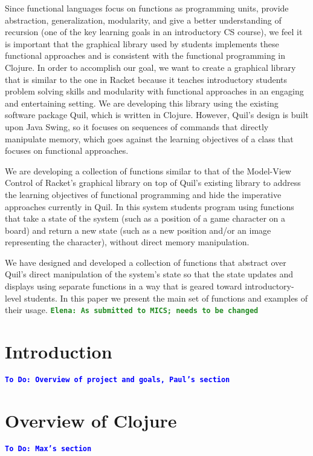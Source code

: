 \documentclass[12pt]{article}
\newcommand{\comment}[1]{{\bf \tt  {#1}}}
\newcommand{\emcomment}[1]{\textcolor{ForestGreen}{\comment{Elena: {#1}}}}
\newcommand{\todo}[1]{\textcolor{blue}{\comment{To Do: {#1}}}}
\begin{document}
Since functional languages focus on functions as programming units, provide abstraction, generalization, modularity, and give a better understanding of recursion (one of the key learning goals in an introductory CS course), we feel it is important that the graphical library used by students implements these functional approaches and is consistent with the functional programming in Clojure. In order to accomplish our goal, we want to create a graphical library that is similar to the one in Racket because it teaches introductory students problem solving skills and modularity with functional approaches in an engaging and entertaining setting. We are developing this library using the existing software package Quil, which is written in Clojure. However, Quil’s design is built upon Java Swing, so it focuses on sequences of commands that directly manipulate memory, which goes against the learning objectives of a class that focuses on functional approaches.

We are developing a collection of functions similar to that of the Model-View Control of Racket’s graphical library on top of Quil’s existing library to address the learning objectives of functional programming and hide the imperative approaches currently in Quil. In this system students program using functions that take a state of the system (such as a position of a game character on a board) and return a new state (such as a new position and/or an image representing the character), without direct memory manipulation.

We have designed and developed a collection of functions that abstract over Quil’s direct manipulation of the system’s state so that the state updates and displays using separate functions in a way that is geared toward introductory-level students. In this paper we present the main set of functions and examples of their usage. 
\emcomment{As submitted to MICS; needs to be changed}


\newpage
\setcounter{page}{1}

\section{Introduction}\label{sec:intro}
\todo{Overview of project and goals, Paul's section}

\section{Overview of Clojure}\label{sec:clojure}
\todo{Max's section}
\end{document}

